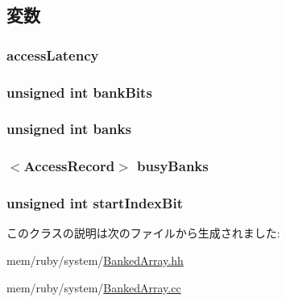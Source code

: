 \subsection{変数}
\hypertarget{classBankedArray_a22569642d188db2401013daf3c1aaf80}{
\subsubsection[{accessLatency}]{ {\bf accessLatency}}}
\label{classBankedArray_a22569642d188db2401013daf3c1aaf80}
\hypertarget{classBankedArray_a2061a8d117a013455257a1ac4159052a}{
\subsubsection[{bankBits}]{\setlength{\rightskip}{0pt plus 5cm}unsigned int {\bf bankBits}}}
\label{classBankedArray_a2061a8d117a013455257a1ac4159052a}
\hypertarget{classBankedArray_af3bc5dde442d2943c967e6a619b651db}{
\subsubsection[{banks}]{\setlength{\rightskip}{0pt plus 5cm}unsigned int {\bf banks}}}
\label{classBankedArray_af3bc5dde442d2943c967e6a619b651db}
\hypertarget{classBankedArray_a26ac330c6dbf83377648d992382927a4}{
\subsubsection[{busyBanks}]{$<${\bf AccessRecord}$>$ {\bf busyBanks}}}
\label{classBankedArray_a26ac330c6dbf83377648d992382927a4}
\hypertarget{classBankedArray_aaf805bffe08ab5ee80012f43977189b7}{
\subsubsection[{startIndexBit}]{\setlength{\rightskip}{0pt plus 5cm}unsigned int {\bf startIndexBit}}}
\label{classBankedArray_aaf805bffe08ab5ee80012f43977189b7}


このクラスの説明は次のファイルから生成されました:\begin{DoxyCompactItemize}
\item 
mem/ruby/system/\hyperlink{BankedArray_8hh}{BankedArray.hh}\item 
mem/ruby/system/\hyperlink{BankedArray_8cc}{BankedArray.cc}\end{DoxyCompactItemize}
